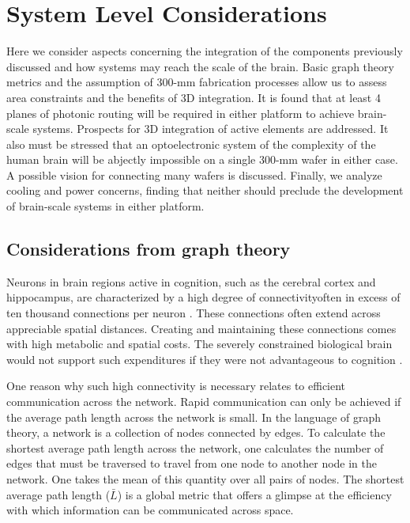 \documentclass[twocolumn]{article}
\begin{document}
\section{\label{sec:instantiation}System Level Considerations}
Here we consider aspects concerning the integration of the components previously discussed and how systems may reach the scale of the brain. Basic graph theory metrics and the assumption of 300-mm fabrication processes allow us to assess area constraints and the benefits of 3D integration. It is found that at least 4 planes of photonic routing will be required in either platform to achieve brain-scale systems. Prospects for 3D integration of active elements are addressed. It also must be stressed that an optoelectronic system of the complexity of the human brain will be abjectly impossible on a single 300-mm wafer in either case. A possible vision for connecting many wafers is discussed. Finally, we analyze cooling and power concerns, finding that neither should preclude the development of brain-scale systems in either platform.

\subsection{Considerations from graph theory}
Neurons in brain regions active in cognition, such as the cerebral cortex and hippocampus, are characterized by a high degree of connectivity\textemdash often in excess of ten thousand connections per neuron \cite{brsc1998,bu2006}. These connections often extend across appreciable spatial distances. Creating and maintaining these connections comes with high metabolic and spatial costs. The severely constrained biological brain would not support such expenditures if they were not advantageous to cognition \cite{busp2012}.

One reason why such high connectivity is necessary relates to efficient communication across the network. Rapid communication can only be achieved if the average path length across the network is small. In the language of graph theory, a network is a collection of nodes connected by edges. To calculate the shortest average path length across the network, one calculates the number of edges that must be traversed to travel from one node to another node in the network. One takes the mean of this quantity over all pairs of nodes. The shortest average path length ($\bar{L}$) is a global metric that offers a glimpse at the efficiency with which information can be communicated across space.
\end{document}
